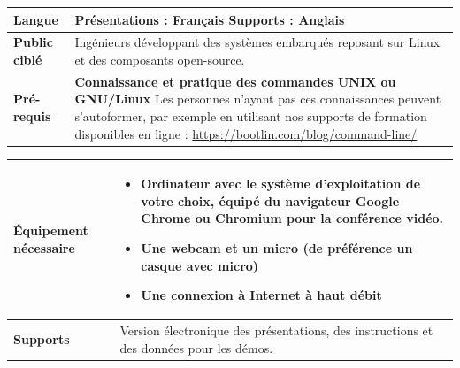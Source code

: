 \documentclass[a4paper,12pt,obeyspaces,spaces,hyphens]{article}
\begin{document}
{\begin{tabularx}{\textwidth}{|g|h|}
    {\bf Langue} & Présentations : Français
    \newline Supports : Anglais\\
    \hline

    {\bf Public ciblé} & Ingénieurs développant des systèmes embarqués
    reposant sur Linux et des composants open-source.\\
    \hline

    {\bf Pré-requis} &

    {\bf Connaissance et pratique des commandes UNIX ou
    GNU/Linux}
    \newline Les personnes n'ayant pas ces connaissances peuvent
    s'autoformer, par exemple en utilisant nos supports de formation
    disponibles en ligne :
    \newline \url{https://bootlin.com/blog/command-line/} \vspace{1em}
    \\
    \hline
  \end{tabularx}

  \begin{tabularx}{\textwidth}{|g|h|}
    {\bf Équipement nécessaire} &
    \begin{itemize}
    \item Ordinateur avec le système d'exploitation de votre choix, équipé du
          navigateur Google Chrome ou Chromium pour la conférence vidéo.
    \item Une webcam et un micro (de préférence un casque avec micro)
    \item Une connexion à Internet à haut débit
    \end{itemize}\\
    \hline

    {\bf Supports} & Version électronique des présentations, des instructions
   et des données pour les démos.\\
    \hline

\end{tabularx}}
\normalsize
\end{document}
